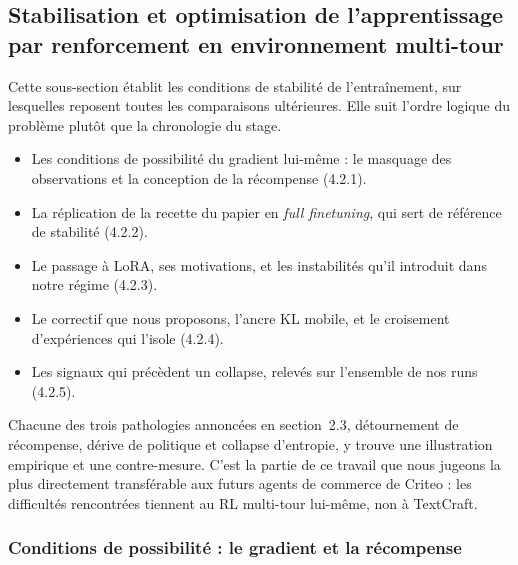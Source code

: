 \documentclass[11pt,a4paper]{article}
\begin{document}
\vspace{2cm}

\subsection{Stabilisation et optimisation de l'apprentissage par renforcement en environnement multi-tour}
\label{subsec:stabilisation}

Cette sous-section établit les conditions de stabilité de l'entraînement, sur lesquelles reposent toutes les comparaisons ultérieures. Elle suit l'ordre logique du problème plutôt que la chronologie du stage.

\begin{itemize}
    \item Les conditions de possibilité du gradient lui-même : le masquage des observations et la conception de la récompense (4.2.1).
    \item La réplication de la recette du papier en \emph{full finetuning}, qui sert de référence de stabilité (4.2.2).
    \item Le passage à LoRA, ses motivations, et les instabilités qu'il introduit dans notre régime (4.2.3).
    \item Le correctif que nous proposons, l'ancre KL mobile, et le croisement d'expériences qui l'isole (4.2.4).
    \item Les signaux qui précèdent un collapse, relevés sur l'ensemble de nos runs (4.2.5).
\end{itemize}

Chacune des trois pathologies annoncées en section~2.3, détournement de récompense, dérive de politique et collapse d'entropie, y trouve une illustration empirique et une contre-mesure. C'est la partie de ce travail que nous jugeons la plus directement transférable aux futurs agents de commerce de Criteo : les difficultés rencontrées tiennent au RL multi-tour lui-même, non à TextCraft.

\subsubsection{Conditions de possibilité : le gradient et la récompense}
\end{document}
